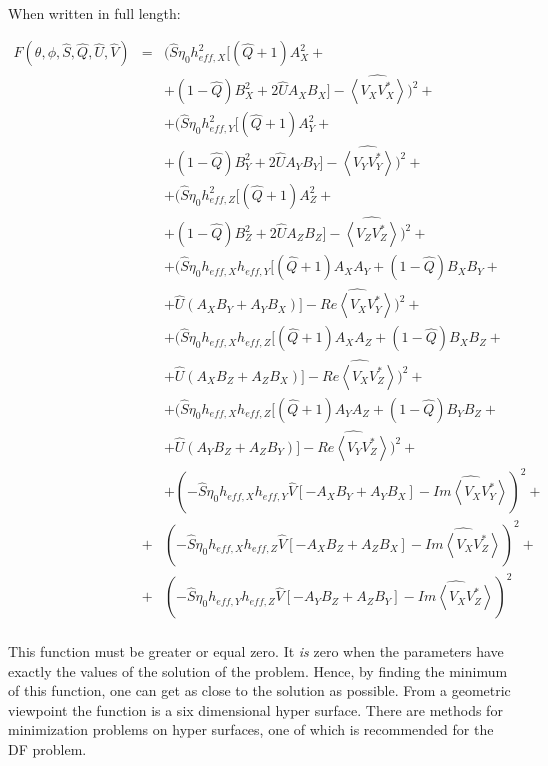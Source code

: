 \documentclass[a4paper,10pt]{thesis}
\begin{document}
\paragraph*{}
When written in full length:

\begin{eqnarray}
F(\theta , \phi, \hat{S},\hat{Q},\hat{U},\hat{V})&=&(\hat{S}\eta_0 h_{eff,X}^2[(\hat{Q}+1) A^2_X + \\
&&+(1-\hat{Q}) B^2_X+ 2 \hat{U}A_X B_X]  - \widehat{\left\langle V_X V_X^{*} \right\rangle})^2+\nonumber \\
&&+(\hat{S}\eta_0 h_{eff,Y}^2[(\hat{Q}+1) A^2_Y + \nonumber \\
&&+(1-\hat{Q}) B^2_Y + 2 \hat{U}A_Y B_Y]  - \widehat{\left\langle V_Y V_Y^{*} \right\rangle})^2 +\nonumber \\
&&+(\hat{S}\eta_0 h_{eff,Z}^2[(\hat{Q}+1) A^2_Z +\nonumber \\
&&+ (1-\hat{Q}) B^2_Z+ 2 \hat{U}A_Z B_Z]  - \widehat{\left\langle V_Z V_Z^{*} \right\rangle})^2 +\nonumber \\
&&+(\hat{S}\eta_0 h_{eff,X} h_{eff,Y}[(\hat{Q}+1) A_X A_Y + (1-\hat{Q}) B_X B_Y  +\nonumber \\
&&+  \hat{U} (A_X B_Y + A_Y B_X)] - \widehat{Re\left\langle V_X V_Y^{*} \right\rangle})^2 +\nonumber \\
&&+(\hat{S}\eta_0 h_{eff,X} h_{eff,Z}[(\hat{Q}+1) A_X A_Z + (1-\hat{Q}) B_X B_Z  +\nonumber \\
&&+  \hat{U} (A_X B_Z + A_Z B_X)] - \widehat{Re\left\langle V_X V_Z^{*} \right\rangle})^2 +\nonumber \\
&&+(\hat{S}\eta_0 h_{eff,X} h_{eff,Z}[(\hat{Q}+1) A_Y A_Z + (1-\hat{Q}) B_Y B_Z  +\nonumber \\
&&+  \hat{U} (A_Y B_Z + A_Z B_Y)] - \widehat{Re\left\langle V_Y V_Z^{*} \right\rangle})^2 +\nonumber \\
&&+(-\hat{S}\eta_0 h_{eff,X} h_{eff,Y} \hat{V}[-A_X B_Y + A_Y B_X ] - \widehat{Im\left\langle V_X V_Y^{*} \right\rangle})^2 +\nonumber \\
&+&(-\hat{S}\eta_0 h_{eff,X} h_{eff,Z} \hat{V}[-A_X B_Z + A_Z B_X ] - \widehat{Im\left\langle V_X V_Z^{*} \right\rangle})^2+ \nonumber\\
&+&(-\hat{S}\eta_0 h_{eff,Y} h_{eff,Z} \hat{V}[-A_Y B_Z + A_Z B_Y ] - \widehat{Im\left\langle V_X V_Z^{*} \right\rangle})^2 \nonumber
\end{eqnarray}


\paragraph*{}
This function must be greater or equal zero. It \emph{is} zero when the parameters have exactly the values of the solution of the problem. Hence, by finding the minimum of this function, one can get as close to the solution as possible. From a geometric viewpoint the function is a six dimensional hyper surface. There are methods for minimization problems on hyper surfaces, one of which is recommended for the DF problem.
\end{document}
